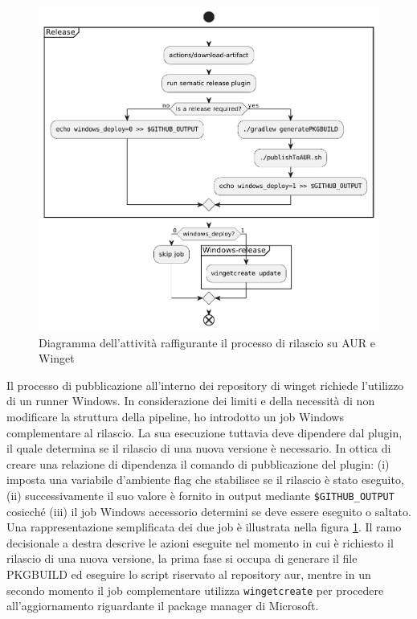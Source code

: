 \begin{figure}[htb]
	\centering
	\includegraphics[width=.95\linewidth]{figures/release-flow.pdf}
	\caption{Diagramma dell'attività raffigurante il processo di rilascio su AUR e Winget}
	\label{fig:release-flow}
\end{figure}

Il processo di pubblicazione all'interno dei repository di winget richiede l'utilizzo di un runner Windows. In considerazione dei limiti e della necessità di non modificare la struttura della pipeline, ho introdotto un job Windows complementare al rilascio. La sua esecuzione tuttavia deve dipendere dal plugin, il quale determina se il rilascio di una nuova versione è necessario. In ottica di creare una relazione di dipendenza il comando di pubblicazione del plugin: (i) imposta una variabile d'ambiente flag che stabilisce se il rilascio è stato eseguito, (ii) successivamente il suo valore è fornito in output mediante \texttt{\$GITHUB\_OUTPUT} cosicché (iii) il job Windows accessorio determini se deve essere eseguito o saltato. Una rappresentazione semplificata dei due job è illustrata nella figura \ref{fig:release-flow}. Il ramo decisionale a destra descrive le azioni eseguite nel momento in cui è richiesto il rilascio di una nuova versione, la prima fase si occupa di generare il file PKGBUILD ed eseguire lo script riservato al repository \ac{aur}, mentre in un secondo momento il job complementare utilizza \texttt{wingetcreate} per procedere all'aggiornamento riguardante il package manager di Microsoft.

